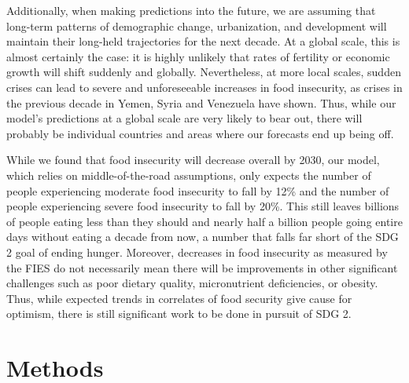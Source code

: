 \documentclass{article}
\begin{document}
Additionally, when making predictions into the future, we are assuming that long-term patterns of demographic change, urbanization, and development will maintain their long-held trajectories for the next decade.  At a global scale, this is almost certainly the case: it is highly unlikely that rates of fertility or economic growth will shift suddenly and globally.  Nevertheless, at more local scales, sudden crises can lead to severe and unforeseeable increases in food insecurity, as crises in the previous decade in Yemen, Syria and Venezuela have shown.  Thus, while our model's predictions at a global scale are very likely to bear out, there will probably be individual countries and areas where our forecasts end up being off.

While we found that food insecurity will decrease overall by 2030, our model, which relies on middle-of-the-road assumptions, only expects the number of people experiencing moderate food insecurity to fall by 12\% and the number of people experiencing severe food insecurity to fall by 20\%.  This still leaves billions of people eating less than they should and nearly half a billion people going entire days without eating a decade from now, a number that falls far short of the SDG 2 goal of ending hunger.  Moreover, decreases in food insecurity as measured by the FIES do not necessarily mean there will be improvements in other significant challenges such as poor dietary quality, micronutrient deficiencies, or obesity.  Thus, while expected trends in correlates of food security give cause for optimism, there is still significant work to be done in pursuit of SDG 2.

\section{Methods}

\end{document}
